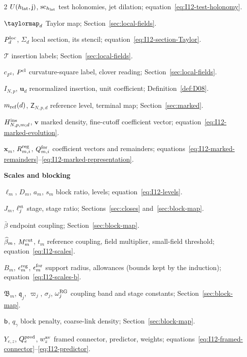 \begin{multicols}{2}
$U(h_{\rm lat},\mathsf j)$, $\operatorname{sc}_{h_{\rm lat}}$ test holonomies, jet dilation; equation~\eqref{eq:I12-test-holonomy}.

$\taylormap_d$ Taylor map; Section~\ref{sec:local-fields}.

$P_{d}^{\mathrm{loc}}$, $\Sigma_d$ local section, its stencil; equation~\eqref{eq:I12-section-Taylor}.

$\mathcal T$ insertion labels; Section~\ref{sec:local-fields}.

$c_{F^2}$, $P^{\rm cl}$ curvature-square label, clover reading; Section~\ref{sec:local-fields}.

$I_{N,p}$, $\mathbf u_d$ renormalized insertion, unit coefficient; Definition~\ref{def:D08}.

$m_{\mathrm{ref}}(d)$, $\mathsf Z_{N,p,d}$ reference level, terminal map; Section~\ref{sec:marked}.

$H^{\rm ins}_{N,p,m;d}$, $\mathbf v$ marked density, fine-cutoff coefficient vector; equation~\eqref{eq:I12-marked-evolution}.

$\mathbf x_m$, $R^{\rm reg}_{m,i}$, $Q^{\rm for}_{m,i}$ coefficient vectors and remainders; equations~\eqref{eq:I12-marked-remainders}--\eqref{eq:I12-marked-representation}.

\medskip\textbf{Scales and blocking}\par
$\ell_m$, $D_m$, $a_m$, $s_m$ block ratio, levels; equation~\eqref{eq:I12-levels}.

$J_m$, $\ell^{\rm st}_j$ stage, stage ratio; Sections~\ref{sec:closes} and~\ref{sec:block-map}.

$\bar\beta$ endpoint coupling; Section~\ref{sec:block-map}.

$\widehat{\beta}_m$, $M^{\mathrm{cut}}_m$, $t_m$ reference coupling, field multiplier, small-field threshold; equation~\eqref{eq:I12-scales}.

$B_m$, $\epsilon_m^{\rm reg}$, $\epsilon_m^{\rm for}$ support radius, allowances (bounds kept by the induction); equation~\eqref{eq:I12-scales-b}.

$\mathfrak B_m$, $\mathfrak q_j$, $\varpi_j$, $\sigma_j$, $\omega^{\rm RG}_j$ coupling band and stage constants; Section~\ref{sec:block-map}.

$\mathsf{b}$, $q_\gamma$ block penalty, coarse-link density; Section~\ref{sec:block-map}.

$Y_{e,z}$, $Q_e^{\rm pred}$, $w^{\rm av}_z$ framed connector, predictor, weights; equations~\eqref{eq:I12-framed-connector}--\eqref{eq:I12-predictor}.


\end{multicols}
